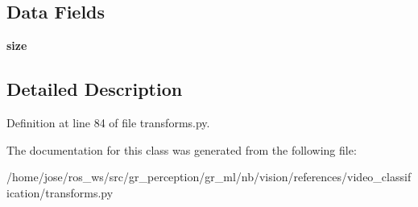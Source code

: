 \subsection*{Data Fields}
\begin{DoxyCompactItemize}
\item 
\mbox{\label{classtransforms_1_1Resize_ac02020d001745ad41a9c07b827dc7347}} 
{\bfseries size}
\end{DoxyCompactItemize}


\subsection{Detailed Description}


Definition at line 84 of file transforms.\+py.



The documentation for this class was generated from the following file\+:\begin{DoxyCompactItemize}
\item 
/home/jose/ros\+\_\+ws/src/gr\+\_\+perception/gr\+\_\+ml/nb/vision/references/video\+\_\+classification/transforms.\+py\end{DoxyCompactItemize}
